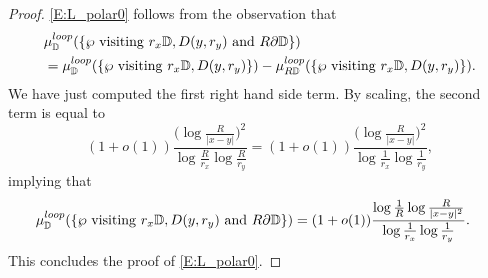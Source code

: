 \documentclass[11pt]{article}
\theoremstyle{remark}
\newcommand{\D}{\mathbb{D}}
\renewcommand{\d}{\mathrm{d}}
\def \loopmeasure{\mu^{\rm loop}}
\def \bubmeasure{\mu^{\rm bub}}
\numberwithin{equation}{section}
\begin{document}
\begin{proof}
\eqref{E:L_polar0} follows from the observation that
\begin{align*}
& \loopmeasure_{\D} ( \{ \wp \mathrm{~visiting~} r_x \D, D(y,r_y) \mathrm{~and~} R \partial \D \} ) \\
& = \loopmeasure_{\D} ( \{ \wp \mathrm{~visiting~} r_x \D, D(y,r_y) \} ) - \loopmeasure_{R\D} ( \{ \wp \mathrm{~visiting~} r_x \D, D(y,r_y) \} ).
\end{align*}
We have just computed the first right hand side term. By scaling, the second term is equal to
\[
(1+o(1)) \frac{\big(\log \frac{R}{|x-y|} \big)^2}{\log \frac{R}{r_x} \log \frac{R}{r_y}}
= (1+o(1)) \frac{\big(\log \frac{R}{|x-y|} \big)^2}{\log \frac{1}{r_x} \log \frac{1}{r_y}},
\]
implying that 
\begin{align*}
& \loopmeasure_{\D} ( \{ \wp \mathrm{~visiting~} r_x \D, D(y,r_y) \mathrm{~and~} R \partial \D \} )
= (1+o(1)) \frac{\log \frac{1}{R} \log \frac{R}{|x-y|^2}}{\log \frac{1}{r_x} \log \frac{1}{r_y}}.
\end{align*}
This concludes the proof of \eqref{E:L_polar0}.

\end{proof}
\end{document}
